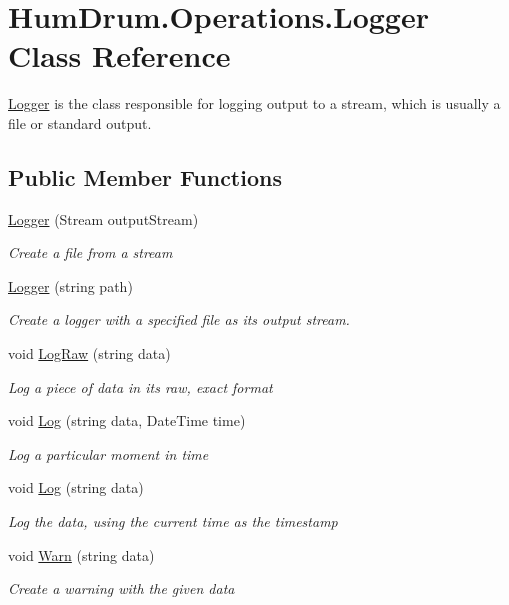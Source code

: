 \hypertarget{classHumDrum_1_1Operations_1_1Logger}{}\section{Hum\+Drum.\+Operations.\+Logger Class Reference}
\label{classHumDrum_1_1Operations_1_1Logger}


\hyperlink{classHumDrum_1_1Operations_1_1Logger}{Logger} is the class responsible for logging output to a stream, which is usually a file or standard output.  


\subsection*{Public Member Functions}
\begin{DoxyCompactItemize}
\item 
\hyperlink{classHumDrum_1_1Operations_1_1Logger_af70b3833eec3d10e4db40c7e6155653f}{Logger} (Stream output\+Stream)
\begin{DoxyCompactList}\small\item\em Create a file from a stream \end{DoxyCompactList}\item 
\hyperlink{classHumDrum_1_1Operations_1_1Logger_ae14a5d07a65158c2d47e6fd30eeed3c5}{Logger} (string path)
\begin{DoxyCompactList}\small\item\em Create a logger with a specified file as its output stream. \end{DoxyCompactList}\item 
void \hyperlink{classHumDrum_1_1Operations_1_1Logger_aa3262d454bca40fcaa50f9efe40f4ecf}{Log\+Raw} (string data)
\begin{DoxyCompactList}\small\item\em Log a piece of data in its raw, exact format \end{DoxyCompactList}\item 
void \hyperlink{classHumDrum_1_1Operations_1_1Logger_a104c5e6b818bf0c33c9c3f2b6e5a5b35}{Log} (string data, Date\+Time time)
\begin{DoxyCompactList}\small\item\em Log a particular moment in time \end{DoxyCompactList}\item 
void \hyperlink{classHumDrum_1_1Operations_1_1Logger_ad29203e9bf7246a3ee8bef90efa558e6}{Log} (string data)
\begin{DoxyCompactList}\small\item\em Log the data, using the current time as the timestamp \end{DoxyCompactList}\item 
void \hyperlink{classHumDrum_1_1Operations_1_1Logger_a517acdd22bdcc327bf508623e0c921a4}{Warn} (string data)
\begin{DoxyCompactList}\small\item\em Create a warning with the given data \end{DoxyCompactList}\end{DoxyCompactItemize}



